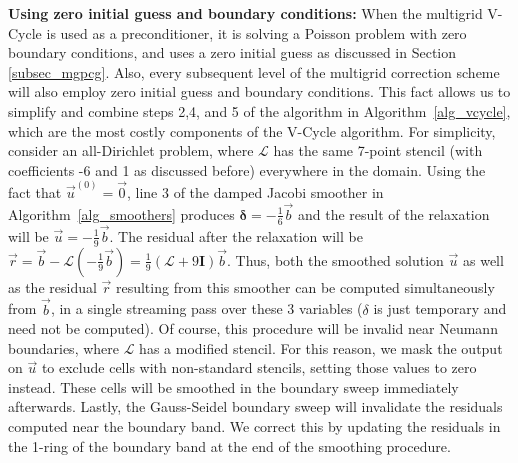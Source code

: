 \noindent\textbf{Using zero initial guess and boundary conditions:} When the multigrid V-Cycle is used as a preconditioner, it is solving a Poisson problem with zero boundary conditions,
and uses a zero initial guess as discussed in Section \ref{subsec_mgpcg}. Also, every subsequent level of the multigrid correction scheme will also employ zero initial guess and
boundary conditions. This fact allows us to simplify and combine steps 2,4, and 5 of the algorithm in Algorithm~\ref{alg_vcycle}, which are the most costly components of the V-Cycle
algorithm. For simplicity, consider an all-Dirichlet problem, where $\mathcal{L}$ has the same 7-point stencil (with coefficients -6 and 1 as discussed before) everywhere in the
domain. Using the fact that $\vec{u}^{(0)}=\vec{0}$, line 3 of the damped Jacobi smoother in Algorithm~\ref{alg_smoothers} produces $\boldsymbol{\delta}=-\frac{1}{6}\vec{b}$ and the result of the
relaxation will be $\vec{u}=-\frac{1}{9}\vec{b}$. The residual after the relaxation will be
$\vec{r}=\vec{b}-\mathcal{L}(-\frac{1}{9}\vec{b})=\frac{1}{9}(\mathcal{L}+9\mathbf{I})\vec{b}$. Thus, both the smoothed solution $\vec{u}$ as well as the residual $\vec{r}$
resulting from this smoother can be computed simultaneously from $\vec{b}$, in a single streaming pass over these 3 variables ($\delta$ is just temporary and need not be computed).
Of course, this procedure will be invalid near Neumann boundaries, where $\mathcal{L}$ has a modified stencil. For this reason, we mask the output on $\vec{u}$ to exclude cells
with non-standard stencils, setting those values to zero instead. These cells will be smoothed in the boundary sweep immediately afterwards. Lastly, the Gauss-Seidel boundary
sweep will invalidate the residuals computed near the boundary band. We correct this by updating the residuals in the 1-ring of the boundary band at the end of the smoothing procedure.


